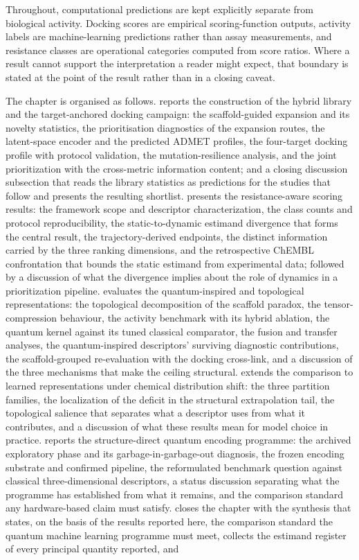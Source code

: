 Throughout, computational predictions are kept explicitly separate from biological activity. Docking scores are empirical scoring-function outputs, activity labels are machine-learning predictions rather than assay measurements, and resistance classes are operational categories computed from score ratios. Where a result cannot support the interpretation a reader might expect, that boundary is stated at the point of the result rather than in a closing caveat.

The chapter is organised as follows.  reports the construction of the hybrid library and the target-anchored docking campaign: the scaffold-guided expansion and its novelty statistics, the prioritisation diagnostics of the expansion routes, the latent-space encoder and the predicted ADMET profiles, the four-target docking profile with protocol validation, the mutation-resilience analysis, and the joint prioritization with the cross-metric information content; and a closing discussion subsection that reads the library statistics as predictions for the studies that follow and presents the resulting shortlist.  presents the resistance-aware scoring results: the framework scope and descriptor characterization, the class counts and protocol reproducibility, the static-to-dynamic estimand divergence that forms the central result, the trajectory-derived endpoints, the distinct information carried by the three ranking dimensions, and the retrospective ChEMBL confrontation that bounds the static estimand from experimental data; followed by a discussion of what the divergence implies about the role of dynamics in a prioritization pipeline.  evaluates the quantum-inspired and topological representations: the topological decomposition of the scaffold paradox, the tensor-compression behaviour, the activity benchmark with its hybrid ablation, the quantum kernel against its tuned classical comparator, the fusion and transfer analyses, the quantum-inspired descriptors' surviving diagnostic contributions, the scaffold-grouped re-evaluation with the docking cross-link, and a discussion of the three mechanisms that make the ceiling structural.  extends the comparison to learned representations under chemical distribution shift: the three partition families, the localization of the deficit in the structural extrapolation tail, the topological salience that separates what a descriptor uses from what it contributes, and a discussion of what these results mean for model choice in practice.  reports the structure-direct quantum encoding programme: the archived exploratory phase and its garbage-in-garbage-out diagnosis, the frozen encoding substrate and confirmed pipeline, the reformulated benchmark question against classical three-dimensional descriptors, a status discussion separating what the programme has established from what it remains, and the comparison standard any hardware-based claim must satisfy.  closes the chapter with the synthesis that states, on the basis of the results reported here, the comparison standard the quantum machine learning programme must meet, collects the estimand register of every principal quantity reported, and 